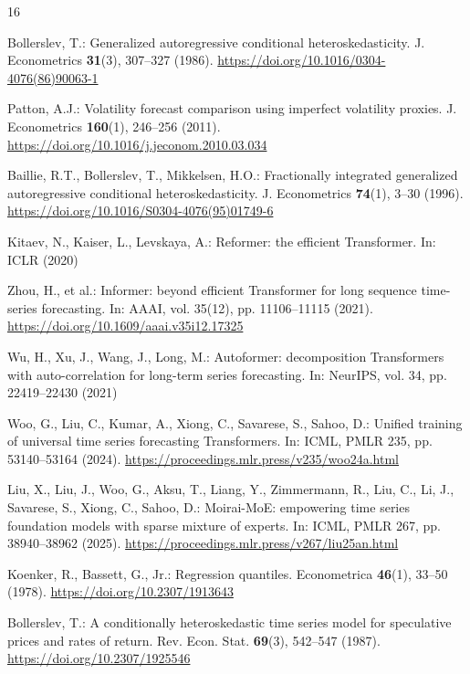 \documentclass[runningheads]{llncs}
\begin{document}
\begin{thebibliography}{16}

Bollerslev, T.: Generalized autoregressive conditional heteroskedasticity.
J. Econometrics \textbf{31}(3), 307--327 (1986).
\url{https://doi.org/10.1016/0304-4076(86)90063-1}

Patton, A.J.: Volatility forecast comparison using imperfect volatility
proxies. J. Econometrics \textbf{160}(1), 246--256 (2011).
\url{https://doi.org/10.1016/j.jeconom.2010.03.034}

Baillie, R.T., Bollerslev, T., Mikkelsen, H.O.: Fractionally integrated
generalized autoregressive conditional heteroskedasticity. J. Econometrics
\textbf{74}(1), 3--30 (1996).
\url{https://doi.org/10.1016/S0304-4076(95)01749-6}

Kitaev, N., Kaiser, L., Levskaya, A.: Reformer: the efficient Transformer.
In: ICLR (2020)

Zhou, H., et al.: Informer: beyond efficient Transformer for long sequence
time-series forecasting. In: AAAI, vol. 35(12), pp. 11106--11115 (2021).
\url{https://doi.org/10.1609/aaai.v35i12.17325}

Wu, H., Xu, J., Wang, J., Long, M.: Autoformer: decomposition Transformers
with auto-correlation for long-term series forecasting. In: NeurIPS,
vol. 34, pp. 22419--22430 (2021)

Woo, G., Liu, C., Kumar, A., Xiong, C., Savarese, S., Sahoo, D.: Unified
training of universal time series forecasting Transformers. In: ICML,
PMLR 235, pp. 53140--53164 (2024).
\url{https://proceedings.mlr.press/v235/woo24a.html}

Liu, X., Liu, J., Woo, G., Aksu, T., Liang, Y., Zimmermann, R., Liu, C.,
Li, J., Savarese, S., Xiong, C., Sahoo, D.: Moirai-MoE: empowering time
series foundation models with sparse mixture of experts. In: ICML,
PMLR 267, pp. 38940--38962 (2025).
\url{https://proceedings.mlr.press/v267/liu25an.html}

Koenker, R., Bassett, G., Jr.: Regression quantiles. Econometrica
\textbf{46}(1), 33--50 (1978).
\url{https://doi.org/10.2307/1913643}

Bollerslev, T.: A conditionally heteroskedastic time series model for
speculative prices and rates of return. Rev. Econ. Stat. \textbf{69}(3),
542--547 (1987). \url{https://doi.org/10.2307/1925546}


\end{thebibliography}
\end{document}
